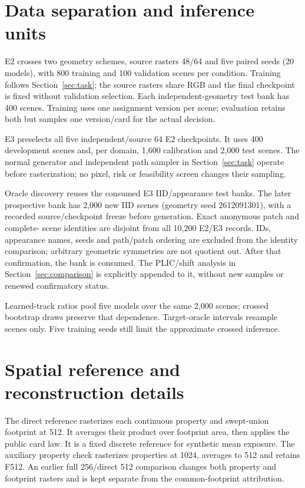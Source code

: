 \section{Data separation and inference units}
E2 crosses two geometry schemes, source rasters 48/64 and five paired seeds
(20 models), with 800 training and 100 validation scenes per condition. Training
follows Section~\ref{sec:task}; the source rasters share RGB and the final
checkpoint is fixed without validation selection. Each independent-geometry
test bank has 400 scenes. Training uses one assignment version per scene;
evaluation retains both but samples one version/card for the actual decision.

E3 preselects all five independent/source 64 E2 checkpoints. It uses 400 development
scenes and, per domain, 1,600 calibration and 2,000 test scenes. The normal
generator and independent path sampler in Section~\ref{sec:task} operate before
rasterization; no pixel, risk or feasibility screen changes their sampling.

Oracle discovery reuses the consumed E3 IID/appearance test banks. The later
prospective bank has 2,000 new IID scenes (geometry seed 2612091301), with a recorded
source/checkpoint freeze before generation. Exact anonymous patch and complete-
scene identities are disjoint from all 10,200 E2/E3 records. IDs, appearance names,
seeds and path/patch ordering are excluded from the identity comparison; arbitrary
geometric symmetries are not quotient out. After that confirmation, the bank is
consumed. The PLIC/shift analysis in Section~\ref{sec:comparison} is explicitly
appended to it, without new samples or renewed confirmatory status.

Learned-track ratios pool five models over the same 2,000 scenes; crossed
bootstrap draws preserve that dependence. Target-oracle intervals resample
scenes only. Five training seeds still limit the approximate crossed inference.

\section{Spatial reference and reconstruction details}
The direct reference rasterizes each continuous property and swept-union footprint
at 512. It averages their product over footprint area, then applies the public
card law. It is a fixed discrete reference for synthetic mean exposure. The
auxiliary property check rasterizes properties at 1024, averages to 512 and retains
F512. An earlier full 256/direct 512 comparison changes both property and footprint
rasters and is kept separate from the common-footprint attribution.

